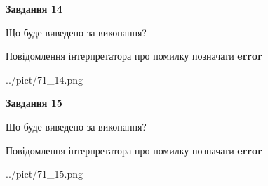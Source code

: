 \documentclass[11pt, ukrainian]{article}
\begin{document}
{\begin {large}
{\begin {center}\textbf{Завдання 14}\end {center}}\par
Що буде виведено за виконання? \par
Повідомлення інтерпретатора про помилку позначати \textbf{error}

\begin{center}
	{../pict/71_14.png}
\end{center}
\newpage

{\begin {center}\textbf{Завдання 15}\end {center}}\par
Що буде виведено за виконання? \par
Повідомлення інтерпретатора про помилку позначати \textbf{error}

\begin{center}
	{../pict/71_15.png}
\end{center}
\newpage

\end {large}}
\end{document}
